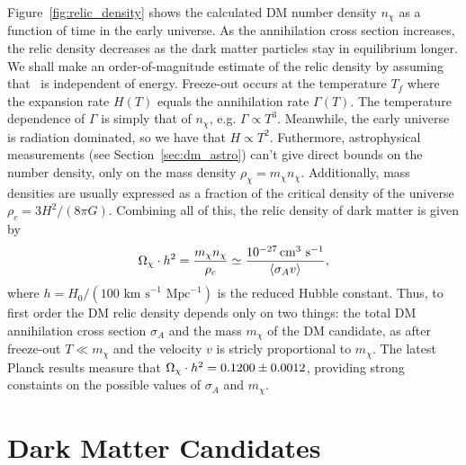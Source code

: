 Figure~\ref{fig:relic_density} shows the calculated DM number density $n_\chi$ as a function of time in the early universe.
As the annihilation cross section increases, the relic density decreases as the dark matter particles stay in equilibrium longer.
We shall make an order-of-magnitude estimate of the relic density by assuming that \sigmav\ is independent of energy.
Freeze-out occurs at the temperature $T_f$ where the expansion rate $H(T)$ equals the annihilation rate $\Gamma(T)$.
The temperature dependence of $\Gamma$ is simply that of $n_\chi$, e.g. $\Gamma \propto T^3$.
Meanwhile, the early universe is radiation dominated, so we have that $H \propto T^2$. 
Futhermore, astrophysical measurements (see Section~\ref{sec:dm_astro}) can't give direct bounds on the number density, only on the mass density $\rho_\chi = m_\chi n_\chi$. 
Additionally, mass densities are usually expressed as a fraction of the critical density of the universe $\rho_c = 3H^2/(8\pi G)$.
Combining all of this, the relic density of dark matter is given by 
\begin{equation}
  \label{eqn:relic_density}
  \Omega_\chi \cdot h^2 = \frac{m_\chi n_\chi}{\rho_c} \simeq \frac{10^{-27} \,\text{cm}^{3}\text{ s}^{-1}}{\langle \sigma_A v \rangle},
\end{equation}
where $h = H_0/(100 \text{ km s}^{-1}\text{ Mpc}^{-1})$ is the reduced Hubble constant. 
Thus, to first order the DM relic density depends only on two things: the total DM annihilation cross section $\sigma_A$ and the mass $m_\chi$ of the DM candidate, as after freeze-out $T \ll m_\chi$ and the velocity $v$ is stricly proportional to $m_\chi$. 
The latest Planck results measure that $\Omega_\chi \cdot h^2 = 0.1200 \pm 0.0012$, providing strong constaints on the possible values of $\sigma_A$ and $m_\chi$.

\section{Dark Matter Candidates}
\label{sec:dm_cand}

